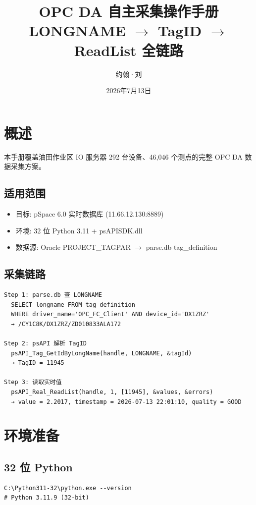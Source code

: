 \documentclass[12pt,a4paper]{ctexart}
\title{\textbf{OPC DA 自主采集操作手册}\\LONGNAME $\to$ TagID $\to$ ReadList 全链路}
\author{约翰·刘}\date{2026年7月13日}
\begin{document}
\maketitle
\tableofcontents
\newpage

\section{概述}

本手册覆盖油田作业区 IO 服务器 292 台设备、46,046 个测点的完整 OPC DA 数据采集方案。

\subsection{适用范围}
\begin{itemize}[leftmargin=*]
  \item 目标: pSpace 6.0 实时数据库 (11.66.12.130:8889)
  \item 环境: 32 位 Python 3.11 + psAPISDK.dll
  \item 数据源: Oracle PROJECT\_TAGPAR $\to$ parse.db tag\_definition
\end{itemize}

\subsection{采集链路}
\begin{verbatim}
Step 1: parse.db 查 LONGNAME
  SELECT longname FROM tag_definition
  WHERE driver_name='OPC_FC_Client' AND device_id='DX1ZRZ'
  → /CY1C8K/DX1ZRZ/ZD010833ALA172

Step 2: psAPI 解析 TagID
  psAPI_Tag_GetIdByLongName(handle, LONGNAME, &tagId)
  → TagID = 11945

Step 3: 读取实时值
  psAPI_Real_ReadList(handle, 1, [11945], &values, &errors)
  → value = 2.2017, timestamp = 2026-07-13 22:01:10, quality = GOOD
\end{verbatim}

\section{环境准备}

\subsection{32 位 Python}
\begin{lstlisting}
C:\Python311-32\python.exe --version
# Python 3.11.9 (32-bit)
\end{lstlisting}
\end{document}
